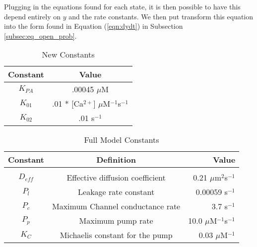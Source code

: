 \documentclass[preprint,12pt]{elsarticle}
\begin{document}
Plugging in the equations found for each state, it is then possible to have this depend entirely on $y$ and the rate constants. We then put transform this equation into the form found in Equation (\ref{eqn:dydt}) in Subsection \ref{subsec:eq_open_prob}.



\clearpage
\listoffigures
\clearpage
\begin{table}[ht]
\caption{New Constants} %
\centering %
\begin{tabular}{c c} %
\hline\hline %
Constant & Value \\ [0.5ex] %
\hline %
$K_{PA}$ & .00045 $\mu$M \\ %
$K_{01}$ & .01 * [Ca$^{2+}$] $\mu$M$^{-1}$s$^{-1}$ \\
$K_{02}$ & .01 s$^{-1}$\\ [1ex] %
\hline %
\end{tabular}
\label{tab:new} %
\end{table}

\begin{table}[ht]
\caption{Full Model Constants} %
\centering %
\begin{tabular}{c c r} %
\hline\hline %
Constant & Definition & Value \\ [0.5ex] %
\hline %
\\
$D_{eff}$ & Effective diffusion coefficient & 0.21 $\mu$m$^2$s$^{-1}$ \\ %
$P_l$ & Leakage rate constant & 0.00059 s$^{-1}$ \\ %
$P_c$ & Maximum Channel conductance rate & 3.7 s$^{-1}$ \\
$P_p$ & Maximum pump rate & 10.0 $\mu$M$^{-1}$s$^{-1}$ \\
$K_C$ & Michaelis constant for the pump & 0.03  $\mu$M$^{-1}$ \\ [1ex] %
\hline %
\end{tabular}
\label{tab:def} %
\end{table}
\end{document}
